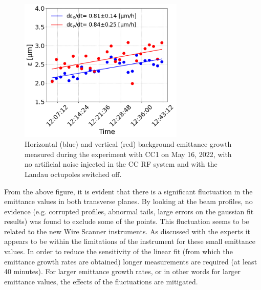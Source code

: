 \begin{figure}[!h] %
   \centering         
   \includegraphics[width=0.7\textwidth]{images/Ch8/cc_md_2022_background_in_scan.png}
       \caption{Horizontal (blue) and vertical (red) background emittance growth measured during the experiment with CC1 on May 16, 2022, with no artificial noise injected in the CC RF system and with the Landau octupoles switched off.}
       \label{fig:cc_md_2022_background_growth_in_scan}
\end{figure}


From the above figure, it is evident that there is a significant fluctuation in the emittance values in both transverse planes. By looking at the beam profiles, no evidence (e.g. corrupted profiles, abnormal tails, large errors on the gaussian fit results) was found to exclude some of the points. This fluctuation seems to be related to the new Wire Scanner instruments. As discussed with the experts it appears to be within the limitations of the instrument for these small emittance values. In order to reduce the sensitivity of the linear fit (from which the emittance growth rates are obtained) longer measurements are required (at least 40 minutes). For larger emittance growth rates, or in other words for larger emittance values, the effects of the fluctuations are mitigated.


